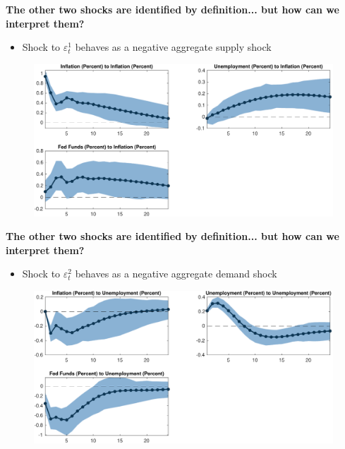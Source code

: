 \documentclass[10pt,english,t,aspectratio=169,ignorenonframetext]{beamer}
\begin{document}

\begin{frame}
{\textbf{The other two shocks are identified by definition... but how can we
interpret them?}}

\begin{itemize}
\item Shock to $\varepsilon^1_{t}$ behaves as a negative aggregate supply
shock
\end{itemize}

\begin{figure}[h]
\includegraphics[width=.75\textwidth]{SW_IR_1.pdf}
\end{figure}
\end{frame}


\begin{frame}
{\textbf{The other two shocks are identified by definition... but how can we
interpret them?}}

\begin{itemize}
\item Shock to $\varepsilon^2_{t}$ behaves as a negative aggregate demand
shock
\end{itemize}

\begin{figure}[h]
\includegraphics[width=.75\textwidth]{SW_IR_2.pdf}
\end{figure}
\end{frame}
\end{document}
